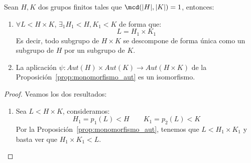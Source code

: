 \begin{teo}\label{teo:grupos_finitos_producto}
    Sean $H,K$ dos grupos finitos tales que $\mcd(|H|,|K|) = 1$, entonces: 
    \begin{enumerate}
        \item $\forall L<H\times K$, $\exists_1 H_1<H, K_1<K$ de forma que:
            \begin{equation*}
                L = H_1\times K_1
            \end{equation*}
            Es decir, todo subgrupo de $H\times K$ se descompone de forma única como un subgrupo de $H$ por un subgrupo de $K$.
        \item La aplicación $\psi:Aut(H)\times Aut(K)\to Aut(H\times K)$ de la Proposición~\ref{prop:monomorfismo_aut} es un isomorfismo.
    \end{enumerate}
    \begin{proof}
        Veamos los dos resultados:
        \begin{enumerate}
            \item Sea $L<H\times K$, consideramos:
                \begin{equation*}
                    H_1 = p_1(L) < H \qquad K_1 = p_2(L) < K
                \end{equation*}
                Por la Proposición~\ref{prop:monomorfismo_aut}, tenemos que $L<H_1\times K_1$ y basta ver que $H_1\times K_1 < L$.


\end{enumerate}
\end{proof}
\end{teo}
